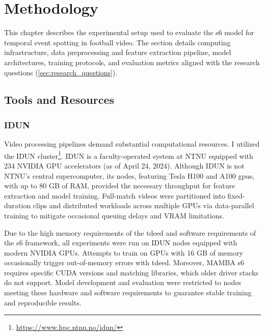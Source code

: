 \chapter{Methodology} 
\label{chap:methodology}
This chapter describes the experimental setup used to evaluate the \acrfull{s6} model for temporal event spotting in football video. The section details computing infrastructure, data preprocessing and feature extraction pipeline, model architectures, training protocols, and evaluation metrics aligned with the research questions (\autoref{sec:research_questions}).


\section{Tools and Resources}
\label{sec:tools_and_resources}

\subsection{IDUN}
\label{ssec:idun}
Video processing pipelines demand substantial computational resources. I utilized the IDUN cluster\footnote{\url{https://www.hpc.ntnu.no/idun/}}. IDUN is a faculty-operated system at NTNU equipped with 234 NVIDIA GPU accelerators (as of April 24, 2024). Although IDUN is not NTNU's central supercomputer, its nodes, featuring Tesla H100 and A100 \acrshort{gpu}s, with up to 80 GB of RAM, provided the necessary throughput for feature extraction and model training. Full-match videos were partitioned into fixed-duration clips and distributed workloads across multiple GPUs via data-parallel training to mitigate occasional queuing delays and VRAM limitations.

Due to the high memory requirements of the \acrlong{tdeed} and software requirements of the \acrlong{s6} framework, all experiments were run on IDUN nodes equipped with modern NVIDIA GPUs. Attempts to train on GPUs with 16 GB of memory occasionally trigger out-of-memory errors with \acrshort{tdeed}. Moreover, MAMBA \acrshort{s6} requires specific CUDA versions and matching libraries, which older driver stacks do not support. Model development and evaluation were restricted to nodes meeting these hardware and software requirements to guarantee stable training and reproducible results. 


